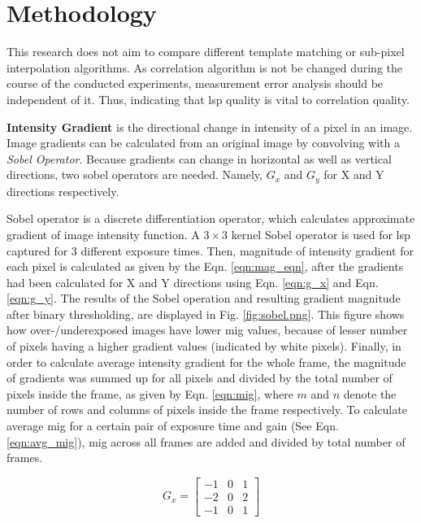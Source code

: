 \chapter{Methodology}\label{chap:methodology}    
    \vspace{5mm}
    This research does not aim to compare different template matching or sub-pixel interpolation algorithms. As correlation algorithm is not be changed during the course of the conducted experiments, measurement error analysis should be independent of it. Thus, indicating that \gls{lsp} quality is vital to correlation quality.
    
    
    \textbf{Intensity Gradient} is the directional change in intensity of a pixel in an image. Image gradients can be calculated from an original image by convolving with a \emph{Sobel Operator}. Because gradients can change in horizontal as well as vertical directions, two sobel operators are needed. Namely, $G_x$ and $G_y$ for X and Y directions respectively.

    \vspace{5mm}
    \noindent Sobel operator is a discrete differentiation operator, which calculates approximate gradient of image intensity function. A $3\times3$ kernel Sobel operator is used for \gls{lsp} captured for 3 different exposure times. Then, magnitude of intensity gradient for each pixel is calculated as given by the Eqn. \ref{eqn:mag_eqn}, after the gradients had been calculated for X and Y directions using Eqn. \ref{eqn:g_x} and Eqn. \ref{eqn:g_y}. The results of the Sobel operation and resulting gradient magnitude after binary thresholding, are displayed in Fig. \ref{fig:sobel.png}. This figure shows how over-/underexposed images have lower \gls{mig} values, because of lesser number of pixels having a higher gradient values (indicated by white pixels). Finally, in order to calculate average intensity gradient for the whole frame, the magnitude of gradients was summed up for all pixels and divided by the total number of pixels inside the frame, as given by Eqn. \ref{eqn:mig}, where $m$ and $n$ denote the number of rows and columns of pixels inside the frame respectively. To calculate average \gls{mig} for a certain pair of exposure time and gain (See Eqn. \ref{eqn:avg_mig}), \gls{mig} across all frames are added and divided by total number of frames. 

    \begin{equation}
        G_x = 
        \begin{bmatrix}
            -1 & 0 & 1 \\
            -2 & 0 & 2 \\
            -1 & 0 & 1 
        \end{bmatrix}
        \label{eqn:g_x}
    \end{equation}

